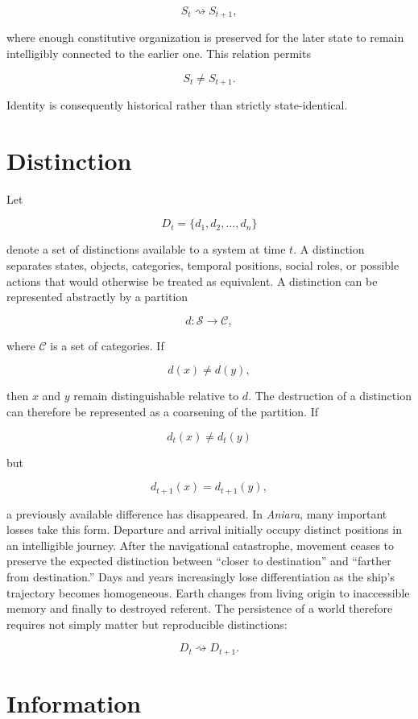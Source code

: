 \documentclass[11pt,oneside]{book}
\theoremstyle{definition}
\theoremstyle{remark}
\begin{document}
\[
S_t\rightsquigarrow S_{t+1},
\]

where enough constitutive organization is preserved for the later state to remain intelligibly
connected to the earlier one. This relation permits

\[
S_t\neq S_{t+1}.
\]

Identity is consequently historical rather than strictly state-identical.

\section{Distinction}

Let

\[
D_t=\{d_1,d_2,\ldots,d_n\}
\]

denote a set of distinctions available to a system at time \(t\). A distinction separates states,
objects, categories, temporal positions, social roles, or possible actions that would otherwise be
treated as equivalent. A distinction can be represented abstractly by a partition

\[
d:\mathcal{S}\rightarrow\mathcal{C},
\]

where \(\mathcal{C}\) is a set of categories. If

\[
d(x)\neq d(y),
\]

then \(x\) and \(y\) remain distinguishable relative to \(d\). The destruction of a distinction can
therefore be represented as a coarsening of the partition. If

\[
d_t(x)\neq d_t(y)
\]

but

\[
d_{t+1}(x)=d_{t+1}(y),
\]

a previously available difference has disappeared. In \emph{Aniara}, many important losses take this
form. Departure and arrival initially occupy distinct positions in an intelligible journey. After
the navigational catastrophe, movement ceases to preserve the expected distinction between ``closer
to destination'' and ``farther from destination.'' Days and years increasingly lose differentiation
as the ship's trajectory becomes homogeneous. Earth changes from living origin to inaccessible
memory and finally to destroyed referent. The persistence of a world therefore requires not simply
matter but reproducible distinctions:

\[
D_t\rightsquigarrow D_{t+1}.
\]

\section{Information}
\end{document}
